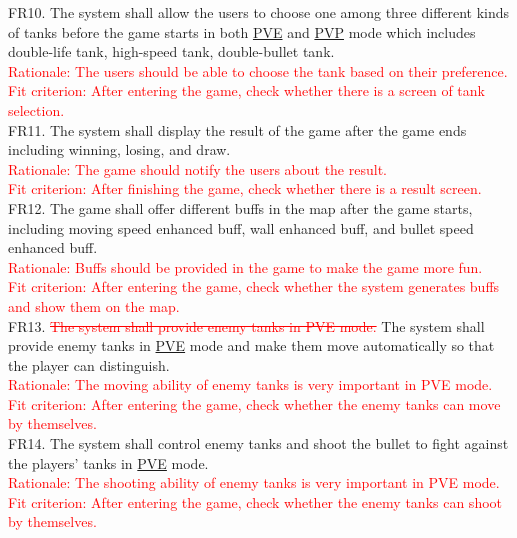\documentclass[12pt, titlepage]{article}
\begin{document}
  FR10. The system shall allow the users to choose one among three different kinds of tanks before the game starts in both \underline{PVE} and \underline{PVP} mode which includes double-life tank, high-speed tank, double-bullet tank.\\
  \textcolor{red}{Rationale: The users should be able to choose the tank based on their preference.\\
  Fit criterion: After entering the game, check whether there is a screen of tank selection.}\\ \newline
  FR11. The system shall display the result of the game after the game ends including winning, losing, and draw.\\
  \textcolor{red}{Rationale: The game should notify the users about the result.\\
  Fit criterion: After finishing the game, check whether there is a result screen.}\\ \newline
  FR12. The game shall offer different buffs in the map after the game starts, including moving speed enhanced buff, wall enhanced buff, and bullet speed enhanced buff.\\
  \textcolor{red}{Rationale: Buffs should be provided in the game to make the game more fun.\\
  Fit criterion: After entering the game, check whether the system generates buffs and show them on the map.}\\ \newline
  FR13. \textcolor{red}{\sout{The system shall provide enemy tanks in PVE mode.}} The system shall provide enemy tanks in \underline{PVE} mode and make them move automatically so that the player can distinguish.\\
  \textcolor{red}{Rationale: The moving ability of enemy tanks is very important in PVE mode.\\
  Fit criterion: After entering the game, check whether the enemy tanks can move by themselves.} \\ \newline
  FR14. The system shall control enemy tanks and shoot the bullet to fight against the players' tanks in \underline{PVE} mode.\\
  \textcolor{red}{Rationale: The shooting ability of enemy tanks is very important in PVE mode.\\
  Fit criterion: After entering the game, check whether the enemy tanks can shoot by themselves.} \\ \newline
\end{document}
